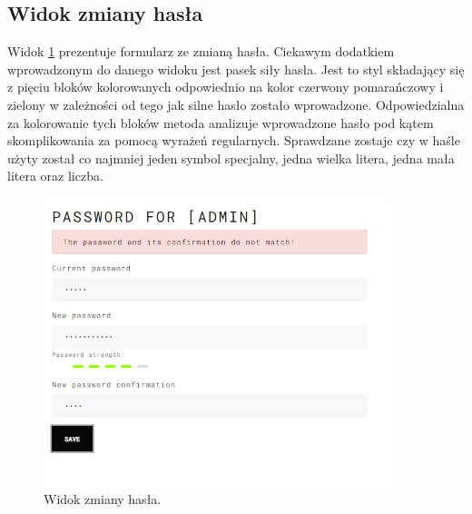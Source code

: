 \subsection{Widok zmiany hasła}
Widok \ref{change-pass} prezentuje formularz ze zmianą hasła. Ciekawym dodatkiem wprowadzonym do danego widoku jest pasek siły hasła. Jest to styl składający się z pięciu bloków kolorowanych odpowiednio na kolor czerwony pomarańczowy i zielony w zależności od tego jak silne hasło zostało wprowadzone. Odpowiedzialna za kolorowanie tych bloków metoda analizuje wprowadzone hasło pod kątem skomplikowania za pomocą wyrażeń regularnych.
Sprawdzane zostaje czy w haśle użyty został co najmniej jeden symbol specjalny, jedna wielka litera, jedna mała litera oraz liczba.
\begin{figure}[h!]
	\centering
	\includegraphics[width=0.90\textwidth]{change-pass}
	
	\caption{Widok zmiany hasła.}
	\label{change-pass}
\end{figure}
\clearpage

